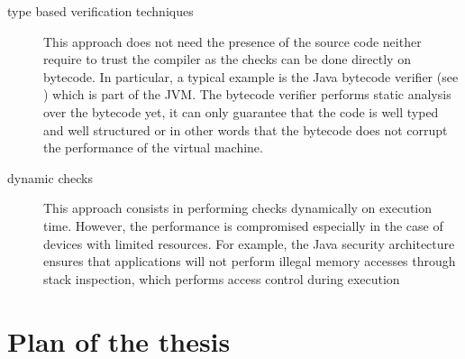 \begin{description}
  
  

   \item [type based verification techniques] 
     This approach does not need the presence of the source code neither require to trust the compiler as
     the checks can be done directly on bytecode. In particular, a typical example is the Java bytecode
     verifier (see \cite{Ljbc}) which is part of the JVM. The bytecode verifier performs static analysis over the bytecode yet,
     it can only guarantee that  the code is well typed and well structured or in other words that the
     bytecode does not corrupt the performance of the virtual machine. 

   \item [dynamic checks] This approach consists in performing checks dynamically on execution time.    
     However, the performance is compromised especially in the case of 
     devices with limited resources.  For example,
     the Java security architecture ensures that applications will not
     perform illegal memory accesses through stack inspection, which
     performs access control during execution
   
     


\end{description}





\section{Plan of the thesis}


